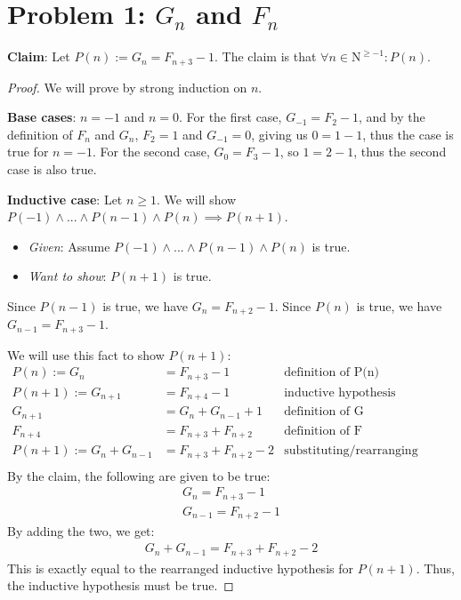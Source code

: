 \documentclass[titlepage]{article}
\begin{document}
 \maketitle

\section{Problem 1: $G_n$ and $F_n$}

\textbf{Claim}: Let $P(n) := G_n = F_{n+3} - 1$.  The claim is that $\forall n \in \mathrm{N}^{\geq -1}: P(n)$.

\begin{proof}
We will prove by strong induction on $n$.

\textbf{Base cases}: $n=-1$ and $n=0$.  For the first case, $G_{-1} = F_{2}-1$, and by the definition of $F_n$ and $G_n$, $F_2 = 1$ and $G_{-1} = 0$, giving us $0 = 1 - 1$, thus the case is true for $n=-1$. For the second case, $G_0 = F_3 - 1$, so $1 = 2 - 1$, thus the second case is also true.


\textbf{Inductive case}: Let $n \geq 1$.  We will show $P(-1) \land ... \land P(n-1) \land P(n) \implies P(n+1)$.
\begin{itemize}
\item \emph{Given}: Assume $P(-1) \land ... \land P(n-1) \land P(n)$ is true.
\item \emph{Want to show}: $P(n+1)$ is true.
\end{itemize}
Since $P(n-1)$ is true, we have
$G_{n} = F_{n+2} - 1$.
Since $P(n)$ is true, we have
$G_{n-1} = F_{n+3} - 1$.

We will use this fact to show $P(n+1)$:
\begin{align*}
P(n) := G_{n} &= F_{n+3} - 1 & \text{definition of P(n)} \\
P(n+1) := G_{n+1} &= F_{n+4} - 1 & \text{inductive hypothesis} \\
G_{n+1} &= G_n + G_{n-1} + 1 & \text{definition of G} \\
F_{n+4} &= F_{n+3} + F_{n+2} & \text{definition of F} \\
P(n+1) := G_n + G_{n-1}&= F_{n+3} + F_{n+2} - 2 & \text{substituting/rearranging terms} \\
\end{align*}
By the claim, the following are given to be true:\\
\begin{align*}
G_{n} = F_{n+3} - 1 \\ 
G_{n-1} = F_{n+2} - 1
\end{align*}
By adding the two, we get:\\
\begin{align*}
G_n + G_{n-1}= F_{n+3} + F_{n+2} - 2
\end{align*}
This is exactly equal to the rearranged inductive hypothesis for $P(n+1)$. Thus, the inductive hypothesis must be true.
\end{proof}
\end{document}
